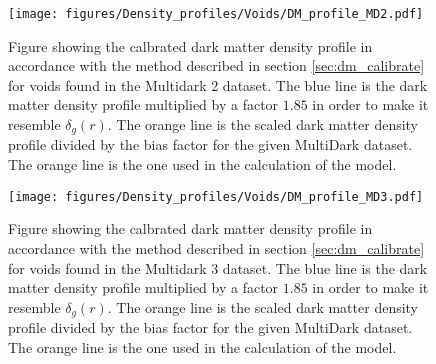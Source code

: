 \begin{figure}[H]
    \texttt{[image: figures/Density\_profiles/Voids/DM\_profile\_MD2.pdf]}
    \caption{Figure showing the calbrated dark matter density profile in accordance with the method described in section \ref{sec:dm_calibrate} for voids found in the Multidark 2 dataset. The blue line is the dark matter density profile multiplied by a factor $1.85$ in order to make it resemble $\delta_g(r)$. The orange line is the scaled dark matter density profile divided by the bias factor for the given MultiDark dataset. The orange line is the one used in the calculation of the model.}
    \label{fig:deltadmMD2}
\end{figure}

\begin{figure}[H]
    \texttt{[image: figures/Density\_profiles/Voids/DM\_profile\_MD3.pdf]}
    \caption{Figure showing the calbrated dark matter density profile in accordance with the method described in section \ref{sec:dm_calibrate} for voids found in the Multidark 3 dataset. The blue line is the dark matter density profile multiplied by a factor $1.85$ in order to make it resemble $\delta_g(r)$. The orange line is the scaled dark matter density profile divided by the bias factor for the given MultiDark dataset. The orange line is the one used in the calculation of the model.}
    \label{fig:deltadmMD3}
\end{figure}

